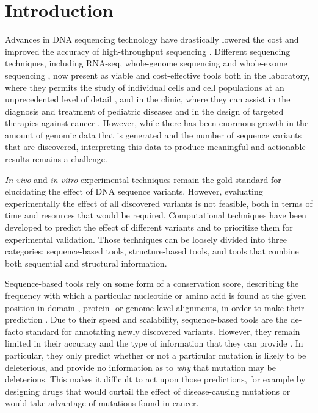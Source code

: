 
\chapter{Introduction} \label{ch:introduction}

Advances in DNA sequencing technology have drastically lowered the cost and improved the accuracy of high-throughput sequencing \cite{wetterstrand_dna_2016}. Different sequencing techniques, including RNA-seq, whole-genome sequencing and whole-exome sequencing \cite{ku_exome_2012}, now present as viable and cost-effective tools both in the laboratory, where they permits the study of individual cells and cell populations at an unprecedented level of detail \cite{eberwine_promise_2014}, and in the clinic, where they can assist in the diagnosis and treatment of pediatric diseases \cite{chrystoja_whole_2014} and in the design of targeted therapies against cancer \cite{nik-zainal_landscape_2016}. However, while there has been enormous growth in the amount of genomic data that is generated and the number of sequence variants that are discovered, interpreting this data to produce meaningful and actionable results remains a challenge.

\textit{In vivo} and \textit{in vitro} experimental techniques remain the gold standard for elucidating the effect of DNA sequence variants. However, evaluating experimentally the effect of all discovered variants is not feasible, both in terms of time and resources that would be required. Computational techniques have been developed to predict the effect of different variants and to prioritize them for experimental validation. Those techniques can be loosely divided into three categories: sequence-based tools, structure-based tools, and tools that combine both sequential and structural information.

Sequence-based tools rely on some form of a conservation score, describing the frequency with which a particular nucleotide or amino acid is found at the given position in domain-, protein- or genome-level alignments, in order to make their prediction \cite{ng_sift:_2003,adzhubei_predicting_2001,li_automated_2009,network_integrated_2011,kircher_general_2014,shihab_ranking_2014,choi_predicting_2012}. Due to their speed and scalability, sequence-based tools are the de-facto standard for annotating newly discovered variants. However, they remain limited in their accuracy and the type of information that they can provide \cite{dorfman_common_2010}. In particular, they only predict whether or not a particular mutation is likely to be deleterious, and provide no information as to \textit{why} that mutation may be deleterious. This makes it difficult to act upon those predictions, for example by designing drugs that would curtail the effect of disease-causing mutations or would take advantage of mutations found in cancer.

